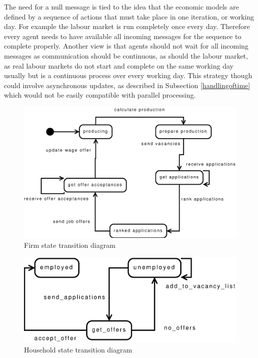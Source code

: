 \documentclass[a4paper,11pt]{article}
\begin{document}
The need for a null message is tied to the idea that the economic models are defined by a sequence of actions that must take place in one iteration, or working day. For example the labour market is run completely once every day. Therefore every agent needs to have available all incoming messages for the sequence to complete properly. Another view is that agents should not wait for all incoming messages as communication should be continuous, as should the labour market, as real labour markets do not start and complete on the same working day usually but is a continuous process over every working day. This strategy though could involve asynchronous updates, as described in Subsection \ref{handlingoftime} which would not be easily compatible with parallel processing.

\begin{figure}
\begin{center}
\includegraphics*[width = \linewidth]{firm_std_1.eps}
\caption{Firm state transition diagram}
\label{fig:firm_std_1}
\end{center}
\end{figure}

\begin{figure}
\begin{center}
\includegraphics*[scale=0.5]{household_std_v1.eps}
\caption{Household state transition diagram}
\label{fig:household_std_1}
\end{center}
\end{figure}
\end{document}

